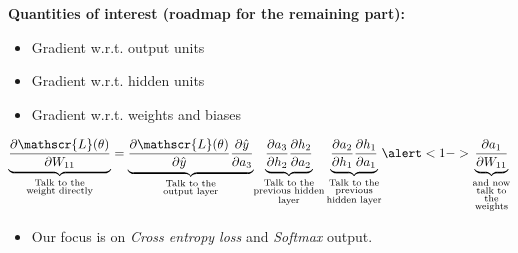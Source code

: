 \savestack{\nnbias}{}
\savestack{\nnweight}{}

\begin{frame}
\end{frame}

\begin{frame}
  \begin{overlayarea}{\textwidth}{\textheight}
    \textbf{Quantities of interest (roadmap for the remaining part):}
    \begin{itemize}
      \item Gradient w.r.t. output units
      \item Gradient w.r.t. hidden units
      \item \alert<1->{Gradient w.r.t. weights and biases}
    \end{itemize}

    \begin{align*}
      \underbrace{\frac{\partial \mathscr{L}(\theta)}{\partial W_{11}}}_
      {\substack{\text{Talk to the}\\ \text{weight directly}}}
      =
      {\underbrace{\frac{\partial \mathscr{L}(\theta)}{\partial \hat{y}} \frac{\partial \hat{y}}{\partial a_{3}}}_
        {\substack{\text{Talk to the} \\ \text{output layer}}}} 
      {\underbrace{\frac{\partial a_{3}}{\partial h_{2}} \frac{\partial h_{2}}{\partial a_{2}}}_
        {\substack{\text{Talk to the} \\ \text{previous hidden} \\ \text{layer}}}
        \underbrace{\frac{\partial a_{2}}{\partial h_{1}} \frac{\partial h_{1}}{\partial a_{1}}}_
        {\substack{\text{Talk to the} \\ \text{previous} \\ \text{hidden layer}}}} 
      \alert<1->{\underbrace{\frac{\partial a_{1}}{\partial W_{11}}}_
        {\substack{\text{and now} \\ \text{talk to} \\ \text{the} \\ \text{weights}}}}
    \end{align*}

    \begin{itemize}
      \item<1-> Our focus is on \textit{Cross entropy loss} and \textit{Softmax} output.
    \end{itemize}
  \end{overlayarea}
\end{frame}

